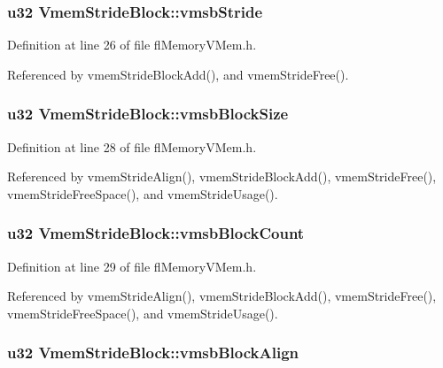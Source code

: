 \subsubsection{\setlength{\rightskip}{0pt plus 5cm}u32 {\bf Vmem\-Stride\-Block::vmsb\-Stride}}\label{structVmemStrideBlock_d73857836c0864dac3da6618cc66bf65}




Definition at line 26 of file fl\-Memory\-VMem.h.

Referenced by vmem\-Stride\-Block\-Add(), and vmem\-Stride\-Free().
\subsubsection{\setlength{\rightskip}{0pt plus 5cm}u32 {\bf Vmem\-Stride\-Block::vmsb\-Block\-Size}}\label{structVmemStrideBlock_959722154a36b2875fc3d42f39b60e0e}




Definition at line 28 of file fl\-Memory\-VMem.h.

Referenced by vmem\-Stride\-Align(), vmem\-Stride\-Block\-Add(), vmem\-Stride\-Free(), vmem\-Stride\-Free\-Space(), and vmem\-Stride\-Usage().
\subsubsection{\setlength{\rightskip}{0pt plus 5cm}u32 {\bf Vmem\-Stride\-Block::vmsb\-Block\-Count}}\label{structVmemStrideBlock_b7056f40c5cf00b4c04e1e28a207d33e}




Definition at line 29 of file fl\-Memory\-VMem.h.

Referenced by vmem\-Stride\-Align(), vmem\-Stride\-Block\-Add(), vmem\-Stride\-Free(), vmem\-Stride\-Free\-Space(), and vmem\-Stride\-Usage().
\subsubsection{\setlength{\rightskip}{0pt plus 5cm}u32 {\bf Vmem\-Stride\-Block::vmsb\-Block\-Align}}\label{structVmemStrideBlock_1c3daac385fb2e0d4d2228cbf67687b2}




